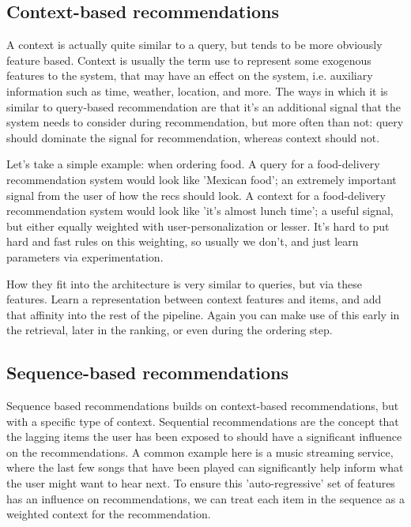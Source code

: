\subsection{Context-based recommendations}

A context is actually quite similar to a query, but tends to be more obviously feature based. Context is usually the term use to represent some exogenous features to the system, that may have an effect on the system, i.e. auxiliary information such as time, weather, location, and more. The ways in which it is similar to query-based recommendation are that it's an additional signal that the system needs to consider during recommendation, but more often than not: query should dominate the signal for recommendation, whereas context should not. 

Let's take a simple example: when ordering food. A query for a food-delivery recommendation system would look like 'Mexican food'; an extremely important signal from the user of how the recs should look. A context for a food-delivery recommendation system would look like 'it's almost lunch time'; a useful signal, but either equally weighted with user-personalization or lesser. It's hard to put hard and fast rules on this weighting, so usually we don't, and just learn parameters via experimentation.

How they fit into the architecture is very similar to queries, but via these features. Learn a representation between context features and items, and add that affinity into the rest of the pipeline. Again you can make use of this early in the retrieval, later in the ranking, or even during the ordering step. 

\subsection{Sequence-based recommendations}

Sequence based recommendations builds on context-based recommendations, but with a specific type of context. Sequential recommendations are the concept that the lagging items the user has been exposed to should have a significant influence on the recommendations. A common example here is a music streaming service, where the last few songs that have been played can significantly help inform what the user might want to hear next. To ensure this 'auto-regressive' set of features has an influence on recommendations, we can treat each item in the sequence as a weighted context for the recommendation.

